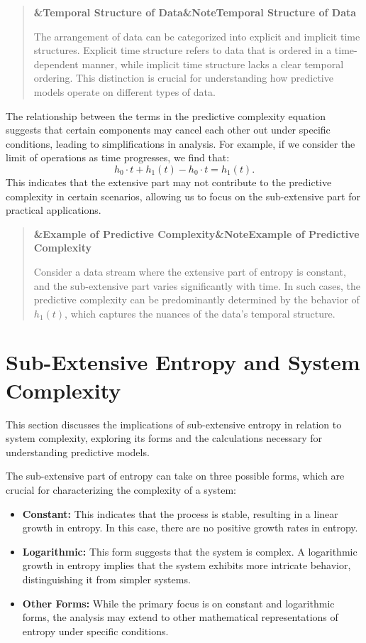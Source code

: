 \documentclass[a4paper]{article}
\newcommand{\boxheading}[1]{%
  \par\smallskip
  \noindent\textbf{\ifx&#1&Note\else#1\fi}\par
  \smallskip
}
\newenvironment{exbox}[1][]{%
  \begin{quote}\color{brown!70!black}\boxheading{#1}\normalcolor
}{\end{quote}}
\newenvironment{rembox}[1][]{%
  \begin{quote}\color{black!70}\boxheading{#1}\normalcolor
}{\end{quote}}
\begin{document}
\begin{rembox}[Temporal Structure of Data]
The arrangement of data can be categorized into explicit and implicit time structures. Explicit time structure refers to data that is ordered in a time-dependent manner, while implicit time structure lacks a clear temporal ordering. This distinction is crucial for understanding how predictive models operate on different types of data.
\end{rembox}

The relationship between the terms in the predictive complexity equation suggests that certain components may cancel each other out under specific conditions, leading to simplifications in analysis. For example, if we consider the limit of operations as time progresses, we find that:
\[
h_0 \cdot t + h_1(t) - h_0 \cdot t = h_1(t).
\]
This indicates that the extensive part may not contribute to the predictive complexity in certain scenarios, allowing us to focus on the sub-extensive part for practical applications.

\begin{exbox}[Example of Predictive Complexity]
Consider a data stream where the extensive part of entropy is constant, and the sub-extensive part varies significantly with time. In such cases, the predictive complexity can be predominantly determined by the behavior of \( h_1(t) \), which captures the nuances of the data's temporal structure.
\end{exbox}

\section{Sub-Extensive Entropy and System Complexity}
This section discusses the implications of sub-extensive entropy in relation to system complexity, exploring its forms and the calculations necessary for understanding predictive models.

The sub-extensive part of entropy can take on three possible forms, which are crucial for characterizing the complexity of a system:

\begin{itemize}
    \item \textbf{Constant:} This indicates that the process is stable, resulting in a linear growth in entropy. In this case, there are no positive growth rates in entropy.
    \item \textbf{Logarithmic:} This form suggests that the system is complex. A logarithmic growth in entropy implies that the system exhibits more intricate behavior, distinguishing it from simpler systems.
    \item \textbf{Other Forms:} While the primary focus is on constant and logarithmic forms, the analysis may extend to other mathematical representations of entropy under specific conditions.
\end{itemize}
\end{document}
